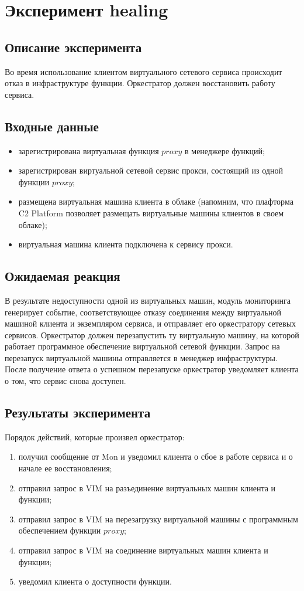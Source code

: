\documentclass[oneside,final,14pt,a4paper]{extreport}
\begin{document}
\section{Эксперимент healing}
\subsection{Описание эксперимента}
Во время использование клиентом виртуального сетевого сервиса происходит отказ в инфраструктуре функции. Оркестратор должен восстановить работу сервиса.

\subsection{Входные данные}
\begin{itemize}
	\item зарегистрирована виртуальная функция $proxy$ в менеджере функций;
	\item зарегистрирован виртуальной сетевой сервис прокси, состоящий из одной функции $proxy$;
	\item размещена виртуальная машина клиента в облаке (напомним, что плафторма C2 Platform позволяет размещать виртуальные машины клиентов в своем облаке);
	\item виртуальная машина клиента подключена к сервису прокси.
\end{itemize}

\subsection{Ожидаемая реакция}
В результате недоступности одной из виртуальных машин, модуль мониторинга генерирует событие, соответствующее отказу соединения между виртуальной машиной клиента и экземпляром сервиса, и отправляет его оркестратору сетевых сервисов. Оркестратор должен перезапустить ту виртуальную машину, на которой работает программное обеспечение виртуальной сетевой функции. Запрос на перезапуск виртуальной машины отправляется в менеджер инфраструктуры. После получение ответа о успешном перезапуске оркестратор уведомляет клиента о том, что сервис снова доступен.

\subsection{Результаты эксперимента}
Порядок действий, которые произвел оркестратор:
\begin{enumerate}
	\item получил сообщение от Mon и уведомил клиента о сбое в работе сервиса и о начале ее восстановления;
	\item отправил запрос в VIM на разъединение виртуальных машин клиента и функции;
	\item отправил запрос в VIM на перезагрузку виртуальной машины с программным обеспечением функции $proxy$;
	\item отправил запрос в VIM на соединение виртуальных машин клиента и функции;
	\item уведомил клиента о доступности функции.
\end{enumerate}
\end{document}
